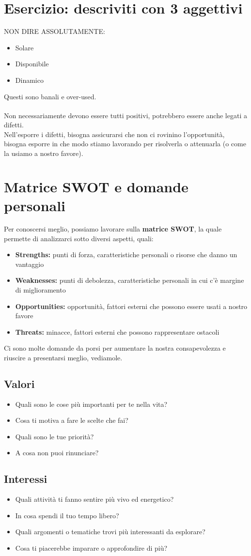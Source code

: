 \documentclass[12pt,a4paper]{article}
\let\oldsection\section
\renewcommand{\section}{\clearpage\oldsection}
\begin{document}
\section{Esercizio: descriviti con 3 aggettivi}
NON DIRE ASSOLUTAMENTE:
\begin{itemize}
  \item Solare
  \item Disponibile
  \item Dinamico
\end{itemize}
Questi sono banali e over-used.\\\\
Non necessariamente devono essere tutti positivi, potrebbero essere anche legati a difetti.\\
Nell'esporre i difetti, bisogna assicurarsi che non ci rovinino l'opportunità, bisogna esporre in che modo stiamo lavorando per risolverla o attenuarla (o come la usiamo a nostro favore).

\section{Matrice SWOT e domande personali}
Per conoscersi meglio, possiamo lavorare sulla \textbf{matrice SWOT}, la quale permette di analizzarci sotto diversi aspetti, quali:
\begin{itemize}
  \item \textbf{Strengths:} punti di forza, caratteristiche personali o risorse che danno un vantaggio
  \item \textbf{Weaknesses:} punti di debolezza, caratteristiche personali in cui c'è margine di miglioramento
  \item \textbf{Opportunities:} opportunità, fattori esterni che possono essere usati a nostro favore
  \item \textbf{Threats:} minacce, fattori esterni che possono rappresentare ostacoli
\end{itemize}
Ci sono molte domande da porsi per aumentare la nostra consapevolezza e riuscire a presentarsi meglio, vediamole.
\subsection{Valori}
\begin{itemize}
  \item Quali sono le cose più importanti per te nella vita?
  \item Cosa ti motiva a fare le scelte che fai?
  \item Quali sono le tue priorità?
  \item A cosa non puoi rinunciare?
\end{itemize}
\subsection{Interessi}
\begin{itemize}
  \item Quali attività ti fanno sentire più vivo ed energetico?
  \item In cosa spendi il tuo tempo libero?
  \item Quali argomenti o tematiche trovi più interessanti da esplorare?
  \item Cosa ti piacerebbe imparare o approfondire di più?
\end{itemize}
\end{document}
